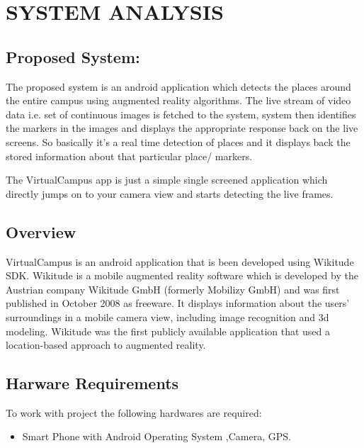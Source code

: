 \documentclass{article}
\begin{document}

\newpage
\section{SYSTEM ANALYSIS }
\subsection{Proposed System: }
\par The proposed system is an android application which detects the places around the entire campus using augmented reality algorithms. The live stream of video data i.e. set of continuous images is fetched to the system, system then identifies the markers in the images and displays the appropriate response back on the live screens. So basically it’s a real time detection of places and it displays back the stored information about that particular place/ markers. 
\par The VirtualCampus app is just a simple single screened application which directly jumps on to your camera view and starts detecting the live frames.   



\subsection{Overview }
\par VirtualCampus is an android application that is been developed using Wikitude SDK. Wikitude is a mobile augmented reality software which is developed by the Austrian company Wikitude GmbH (formerly Mobilizy GmbH) and was first published in October 2008 as freeware. It displays information about the users' surroundings in a mobile camera view, including image recognition and 3d modeling. Wikitude was the first publicly available application that used a location-based approach to augmented reality. 




\subsection{Harware Requirements}
\par To work with project the following hardwares are required:
\begin{itemize}
\item Smart Phone with Android Operating System ,Camera, GPS.
\end{itemize}
\end{document}
